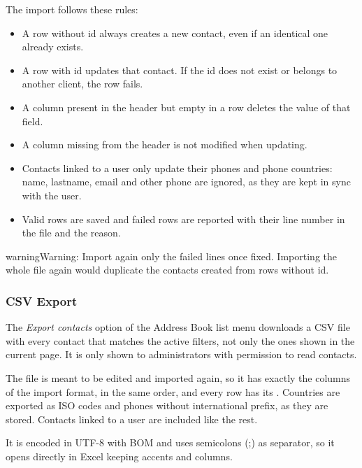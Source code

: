 \documentclass[letterpaper,10pt,english]{sphinxmanual}
\begin{document}
The import follows these rules:
\begin{itemize}
\item {} 
A row without id always creates a new contact, even if an identical one already exists.

\item {} 
A row with id updates that contact. If the id does not exist or belongs to another client, the row fails.

\item {} 
A column present in the header but empty in a row deletes the value of that field.

\item {} 
A column missing from the header is not modified when updating.

\item {} 
Contacts linked to a user only update their phones and phone countries: name, lastname, email and other
phone are ignored, as they are kept in sync with the user.

\item {} 
Valid rows are saved and failed rows are reported with their line number in the file and the reason.

\end{itemize}

\begin{notice}{warning}{Warning:}
Import again only the failed lines once fixed. Importing the whole file again would duplicate
the contacts created from rows without id.
\end{notice}


\subsubsection{CSV Export}
\label{administration_portal/client/vpbx/addressbook:csv-export}
The \emph{Export contacts} option of the Address Book list menu downloads a CSV file with every contact that
matches the active filters, not only the ones shown in the current page. It is only shown to administrators
with permission to read contacts.

The file is meant to be edited and imported again, so it has exactly the columns of the import format, in the
same order, and every row has its . Countries are exported as ISO codes and phones without
international prefix, as they are stored. Contacts linked to a user are included like the rest.

It is encoded in UTF-8 with BOM and uses semicolons (;) as separator, so it opens directly in Excel keeping
accents and columns.
\end{document}
